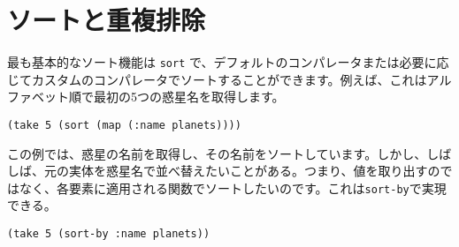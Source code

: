 \section{ソートと重複排除}

最も基本的なソート機能は \texttt{sort} で、デフォルトのコンパレータまたは必要に応じてカスタムのコンパレータでソートすることができます。例えば、これはアルファベット順で最初の5つの惑星名を取得します。


\begin{lstlisting}[numbers=none]
(take 5 (sort (map (:name planets))))
\end{lstlisting}

この例では、惑星の名前を取得し、その名前をソートしています。しかし、しばしば、元の実体を惑星名で並べ替えたいことがある。つまり、値を取り出すのではなく、各要素に適用される関数でソートしたいのです。これは\texttt{sort-by}で実現できる。


\begin{lstlisting}[numbers=none]
(take 5 (sort-by :name planets))
\end{lstlisting}

